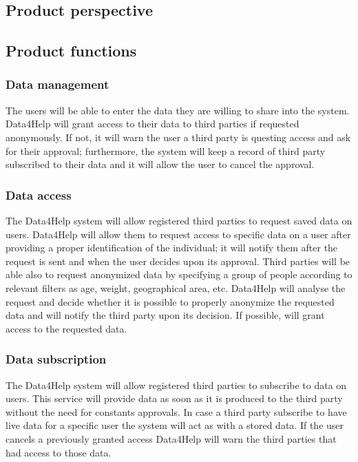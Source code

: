 \subsection{Product perspective}
\subsection{Product functions}
\subsubsection{Data management}
The users will be able to enter the data they are willing to share into the system. Data4Help will grant access to their data to third parties if requested anonymously. If not, it will warn the user a third party is questing access and ask for their approval; furthermore, the system will keep a record of third party subscribed to their data and it will allow the user to cancel the approval.
\subsubsection{Data access}
The Data4Help system will allow registered third parties to request saved data on users. Data4Help will allow them to request access to specific data on a user after providing a proper identification of the individual; it will notify them after the request is sent and when the user decides upon its approval.
Third parties will be able also to request anonymized data by specifying a group of people according to relevant filters as age, weight, geographical area, etc. 
Data4Help will analyse the request and decide whether it is possible to properly anonymize the requested data and will notify the third party upon its decision. If possible, will grant access to the requested data.
\subsubsection{Data subscription}
The Data4Help system will allow registered third parties to subscribe to data on users. This service will provide data as soon as it is produced to the third party without the need for constants approvals.
In case a third party subscribe to have live data for a specific user the system will act as with a stored data. If the user cancels a previously granted access Data4Help will warn the third parties that had access to those data.
\\

